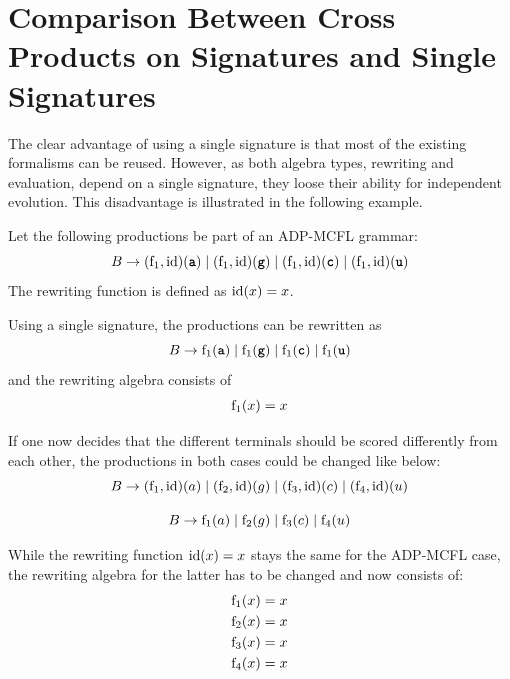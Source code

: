 \documentclass[
    a4paper,
    12pt,
    twoside,
    BCOR=12mm,
    parskip=half,
    chapterprefix,
    numbers=noenddot,
    bibliography=totoc
]{scrbook}
\begin{document}
\section{Comparison Between Cross Products on Signatures and Single Signatures}

The clear advantage of using a single signature is that most of the existing formalisms can be reused. However, as both algebra types, rewriting and evaluation, depend on a single signature, they loose their ability for independent evolution. This disadvantage is illustrated in the following example.

Let the following productions be part of an ADP-MCFL grammar:
\begin{equation}
	B \to (\op{f}_1,\op{id})(\ts{a}) \mid (\op{f}_1,\op{id})(\ts{g}) \mid (\op{f}_1,\op{id})(\ts{c}) \mid (\op{f}_1,\op{id})(\ts{u})
\end{equation}
The rewriting function is defined as $\mathrm{id}(x)=x$.

Using a single signature, the productions can be rewritten as
\begin{equation}
	B \to \op{f}_1(\ts{a}) \mid \op{f}_1(\ts{g}) \mid \op{f}_1(\ts{c}) \mid \op{f}_1(\ts{u})
\end{equation}
and the rewriting algebra consists of
\begin{align*}
	\mathrm{f}_1(x)=x
\end{align*}

If one now decides that the different terminals should be scored differently from each other, the productions in both cases could be changed like below:
\begin{equation}
	B \to (\mathrm{f}_1,\mathrm{id})(a) \mid (\mathrm{f}_2,\mathrm{id})(g) \mid (\mathrm{f}_3,\mathrm{id})(c) \mid (\mathrm{f}_4,\mathrm{id})(u)
\end{equation}

\begin{equation}
	B \to \mathrm{f}_1(a) \mid \mathrm{f}_2(g) \mid \mathrm{f}_3(c) \mid \mathrm{f}_4(u)
\end{equation}

While the rewriting function $\mathrm{id}(x)=x$ stays the same for the ADP-MCFL case, the rewriting algebra for the latter has to be changed and now consists of:
\begin{align*}
	\mathrm{f}_1(x)&=x\\
	\mathrm{f}_2(x)&=x\\
	\mathrm{f}_3(x)&=x\\
	\mathrm{f}_4(x)&=x
\end{align*}
\end{document}
